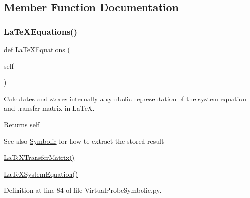 \subsection{Member Function Documentation}
\mbox{\label{classSignalIntegrity_1_1SystemDescriptions_1_1VirtualProbeSymbolic_1_1VirtualProbeSymbolic_a3f6cd3290ceb07e8985e1eb832be3934}} 
\subsubsection{\texorpdfstring{La\+Te\+X\+Equations()}{LaTeXEquations()}}
{\footnotesize\ttfamily def La\+Te\+X\+Equations (\begin{DoxyParamCaption}\item[{}]{self }\end{DoxyParamCaption})}



Calculates and stores internally a symbolic representation of the system equation and transfer matrix in La\+TeX. 

\begin{DoxyReturn}{Returns}
self 
\end{DoxyReturn}
\begin{DoxySeeAlso}{See also}
\hyperlink{namespaceSignalIntegrity_1_1SystemDescriptions_1_1Symbolic}{Symbolic} for how to extract the stored result 

\hyperlink{classSignalIntegrity_1_1SystemDescriptions_1_1VirtualProbeSymbolic_1_1VirtualProbeSymbolic_adc83c150e43916083e3379cd4b9bb80e}{La\+Te\+X\+Transfer\+Matrix()} 

\hyperlink{classSignalIntegrity_1_1SystemDescriptions_1_1SystemDescriptionSymbolic_1_1SystemDescriptionSymbolic_ab91378c2a97ec0d38ee1c70988142eb5}{La\+Te\+X\+System\+Equation()} 
\end{DoxySeeAlso}


Definition at line 84 of file Virtual\+Probe\+Symbolic.\+py.

